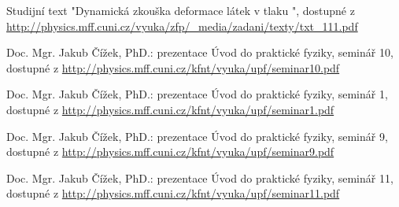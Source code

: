 \documentclass[protokol.tex]{subfiles}
\begin{document}
\begin{thebibliography}{}

Studijní text "Dynamická zkouška deformace látek v tlaku ", dostupné z\\ \url{http://physics.mff.cuni.cz/vyuka/zfp/_media/zadani/texty/txt_111.pdf}

Doc. Mgr. Jakub Čížek, PhD.: prezentace Úvod do praktické fyziky, seminář 10, dostupné z \url{http://physics.mff.cuni.cz/kfnt/vyuka/upf/seminar10.pdf}

Doc. Mgr. Jakub Čížek, PhD.: prezentace Úvod do praktické fyziky, seminář 1, dostupné z \url{http://physics.mff.cuni.cz/kfnt/vyuka/upf/seminar1.pdf}

Doc. Mgr. Jakub Čížek, PhD.: prezentace Úvod do praktické fyziky, seminář 9, dostupné z \url{http://physics.mff.cuni.cz/kfnt/vyuka/upf/seminar9.pdf}

Doc. Mgr. Jakub Čížek, PhD.: prezentace Úvod do praktické fyziky, seminář 11, dostupné z \url{http://physics.mff.cuni.cz/kfnt/vyuka/upf/seminar11.pdf}

\end{thebibliography}
\end{document}
